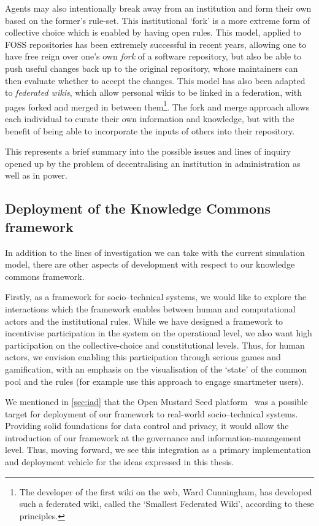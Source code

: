 Agents may also intentionally break away from an institution and form their
own based on the former's rule-set. This institutional `fork' is a more
extreme form of collective choice which is enabled by having open rules. This
model, applied to \ac{FOSS} repositories has been extremely successful in
recent years, allowing one to have free reign over one's own \emph{fork} of a
software repository, but also be able to push useful changes back up to the
original repository, whose maintainers can then evaluate whether to accept the
changes. This model has also been adapted to \emph{federated wikis}, which
allow personal wikis to be linked in a federation, with pages forked and merged
in between them\footnote{The developer of the first wiki on the web, Ward
Cunningham, has developed such a federated wiki, called the `Smallest
Federated Wiki', according to these principles.}. The fork and merge approach
allows each individual to curate their own information and knowledge, but with
the benefit of being able to incorporate the inputs of others into their
repository.

This represents a brief summary into the possible issues and lines of inquiry opened up by the problem of decentralising an institution in administration as well as in power.

\subsection{Deployment of the Knowledge Commons framework}

In addition to the lines of investigation we can take with the current
simulation model, there are other aspects of development with respect to our
knowledge commons framework.

Firstly, as a framework for socio--technical systems, we would like to explore
the interactions which the framework enables between human and computational
actors and the institutional rules. While we have designed a framework to
incentivise participation in the system on the operational level, 
we also want high participation on the collective-choice and
constitutional levels. Thus, for human actors, we envision enabling this
participation through serious games and gamification, with an emphasis on the
visualisation of the `state' of the common pool and the rules (for example
\citet{Bourazeri12} use this approach to engage smartmeter users). 

We mentioned in \autoref{sec:iad} that the Open Mustard Seed
platform~\citep{Hardjono2014a} was a possible target for deployment of our
framework to real-world socio--technical systems. Providing solid foundations
for data control and privacy, it would allow the introduction of our framework
at the governance and information-management level. Thus, moving forward, we
see this integration as a primary implementation and deployment vehicle for
the ideas expressed in this thesis.

